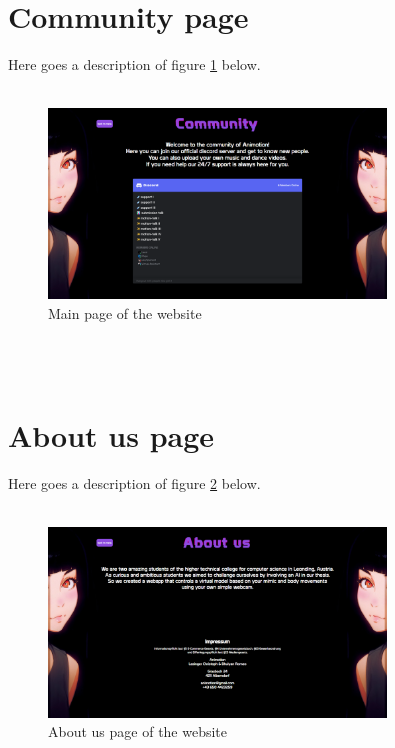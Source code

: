 \section{Community page}
Here goes a description of figure \ref{fig:communitypage} below.
\\
\\
\begin{figure}[htb]
    \centering
    \includegraphics[width=0.8\textwidth]{pics/Animotion_community.png}
    \caption{Main page of the website}
    \label{fig:communitypage}
\end{figure}
\\
\\
\section{About us page}
Here goes a description of figure \ref{fig:aboutpage} below.
\\
\\
\begin{figure}[htb]
    \centering
    \includegraphics[width=0.8\textwidth]{pics/Animotion_aboutus.png}
    \caption{About us page of the website}
    \label{fig:aboutpage}
\end{figure}
\\
\\
